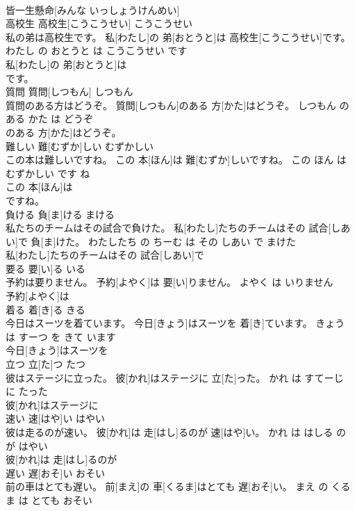\documentclass[8pt]{extreport}
\begin{document}
\begin{CJK}{UTF8}{min}
\\	皆一生懸命[みんな いっしょうけんめい]
\\	高校生	高校生[こうこうせい]	こうこうせい	
\\	私の弟は高校生です。	私[わたし]の 弟[おとうと]は 高校生[こうこうせい]です。	わたし の おとうと は こうこうせい です	
\\	私[わたし]の 弟[おとうと]は
\\	です。			
\\	質問	質問[しつもん]	しつもん	
\\	質問のある方はどうぞ。	質問[しつもん]のある 方[かた]はどうぞ。	しつもん の ある かた は どうぞ	
\\	のある 方[かた]はどうぞ。			
\\	難しい	難[むずか]しい	むずかしい	
\\	この本は難しいですね。	この 本[ほん]は 難[むずか]しいですね。	この ほん は むずかしい です ね	
\\	この 本[ほん]は
\\	ですね。			
\\	負ける	負[ま]ける	まける	
\\	私たちのチームはその試合で負けた。	私[わたし]たちのチームはその 試合[しあい]で 負[ま]けた。	わたしたち の ちーむ は その しあい で まけた	
\\	私[わたし]たちのチームはその 試合[しあい]で
\\	要る	要[い]る	いる	
\\	予約は要りません。	予約[よやく]は 要[い]りません。	よやく は いりません	
\\	予約[よやく]は
\\	着る	着[き]る	きる	
\\	今日はスーツを着ています。	今日[きょう]はスーツを 着[き]ています。	きょう は すーつ を きて います	
\\	今日[きょう]はスーツを
\\	立つ	立[た]つ	たつ	
\\	彼はステージに立った。	彼[かれ]はステージに 立[た]った。	かれ は すてーじ に たった	
\\	彼[かれ]はステージに
\\	速い	速[はや]い	はやい	
\\	彼は走るのが速い。	彼[かれ]は 走[はし]るのが 速[はや]い。	かれ は はしる の が はやい	
\\	彼[かれ]は 走[はし]るのが
\\	遅い	遅[おそ]い	おそい	
\\	前の車はとても遅い。	前[まえ]の 車[くるま]はとても 遅[おそ]い。	まえ の くるま は とても おそい	

\end{CJK}
\end{document}
